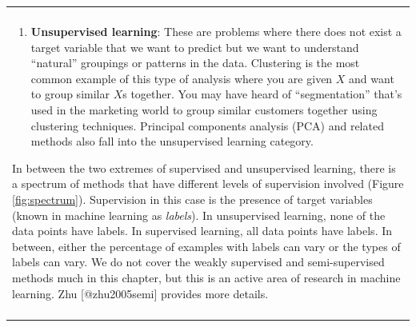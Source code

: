 \documentclass[]{krantz}
\newenvironment{F00}
    {\begin{center}
    \begin{tabular}{|p{0.9\textwidth}|}
    \hline\\
    }
    { 
    \\\\\hline
    \end{tabular} 
    \end{center}
    }
\begin{document}
\begin{F00}
\begin{enumerate}
  The goal of supervised learning methods is to search for that function
  \(F\) that best estimates or predicts \(Y\). When the output \(Y\) is
  categorical, this is known as \emph{classification}. When \(Y\) is a
  continuous value, this is called \emph{regression}. Sound familiar?

  One key distinction in machine learning is that the goal is not just
  to find the best function \(F\) that can estimate or predict \(Y\) for
  observed outcomes (known \(Y\)s) but to find one that best generalizes
  to new, unseen data, often in the future. This distinction makes
  methods more focused on generalization and less on just fitting the
  data we have as best as we can. It is important to note that you do
  that implicitly when performing regression by not adding more and more
  higher-order terms to get better fit statistics. By getting better fit
  statistics, we \emph{overfit} to the data and the performance on new
  (unseen) data often goes down. Methods like the lasso
  {[}@tibshirani1996regression{]} penalize the model for having too many
  terms by performing what is known as \emph{regularization}\footnote{In
    statistical terms, regularization is an attempt to avoid overfitting
    the model}.
\item
  \textbf{Unsupervised learning}: These are problems where there does
  not exist a target variable that we want to predict but we want to
  understand ``natural'' groupings or patterns in the data. Clustering
  is the most common example of this type of analysis where you are
  given \(X\) and want to group similar \(X\)s together. You may have
  heard of ``segmentation'' that's used in the marketing world to group
  similar customers together using clustering techniques. Principal
  components analysis (PCA) and related methods also fall into the
  unsupervised learning category.
\end{enumerate}

In between the two extremes of supervised and unsupervised learning,
there is a spectrum of methods that have different levels of supervision
involved (Figure \ref{fig:spectrum}). Supervision in this case is the
presence of target variables (known in machine learning as
\emph{labels}). In unsupervised learning, none of the data points have
labels. In supervised learning, all data points have labels. In between,
either the percentage of examples with labels can vary or the types of
labels can vary. We do not cover the weakly supervised and
semi-supervised methods much in this chapter, but this is an active area
of research in machine learning. Zhu {[}@zhu2005semi{]} provides more
details.
\end{F00}\begin{figure}


\end{figure}
\end{document}
